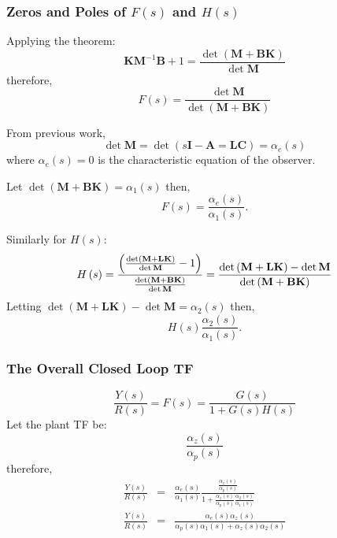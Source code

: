  
\subsubsection*{Zeros and Poles of $F(s)$ and $H(s)$} %
\label{ssub:zeros_and_poles_of_f_s_and_h_s_}

Applying the theorem:
\[
\mathbf{KM}^{-1}\mathbf{B}+1=\frac{\det\left(\mathbf{M}+\mathbf{BK}\right)}{\det{\mathbf{M}}}
\]
therefore,
\[
F(s) = \frac{\det\mathbf{M}}{\det\left(\mathbf{M}+\mathbf{BK}\right)}
\]

From previous work,
\[
\det\mathbf{M}=\det\left(s\mathbf{I}-\mathbf{A}=\mathbf{LC}\right)=\alpha_e(s)
\]
where $\alpha_e(s)=0$ is the characteristic equation of the observer.

Let $\det\left(\mathbf{M}+\mathbf{BK}\right)=\alpha_1(s)$ then,
\[
F(s)=\frac{\alpha_e(s)}{\alpha_1(s)}.
\]

Similarly for $H(s)$:
\[
H\left( s \right) = \frac{{\left( {\frac{{\det \left( {{\bf{M}} + {\bf{LK}}} \right)}}{{\det {\bf{M}}}} - 1} \right)}}{{\frac{{\det \left( {{\bf{M}} + {\bf{BK}}} \right)}}{{\det {\bf{M}}}}}} = \frac{{\det \left( {{\bf{M}} + {\bf{LK}}} \right) - \det {\bf{M}}}}{{\det \left( {{\bf{M}} + {\bf{BK}}} \right)}}
\]
Letting $\det\left(\mathbf{M}+\mathbf{LK}\right)-\det\mathbf{M}=\alpha_2(s)$ then,
\[
H(s)\frac{\alpha_2(s)}{\alpha_1(s)}.
\]



\subsubsection*{The Overall Closed Loop TF} %
\label{ssub:the_overall_closed_loop_tf}
\[
\frac{Y(s)}{R(s)}=F(s)=\frac{G(s)}{1+G(s)H(s)}
\]
Let the plant TF be:
\[
\frac{\alpha_z(s)}{\alpha_p(s)}
\]
therefore,
\begin{eqnarray*}
	\frac{Y(s)}{R(s)} &=& \frac{\alpha_e(s)}{\alpha_1(s)}\frac{\frac{\alpha_z(s)}{\alpha_p(s)}}{1+\frac{\alpha_z(s)}{\alpha_p(s)}\frac{\alpha_2(s)}{\alpha_1(s)}} \\
	\frac{Y(s)}{R(s)} &=& \frac{\alpha_e(s)\alpha_z(s)}{\alpha_p(s)\alpha_1(s)+\alpha_z(s)\alpha_2(s)}
\end{eqnarray*}

